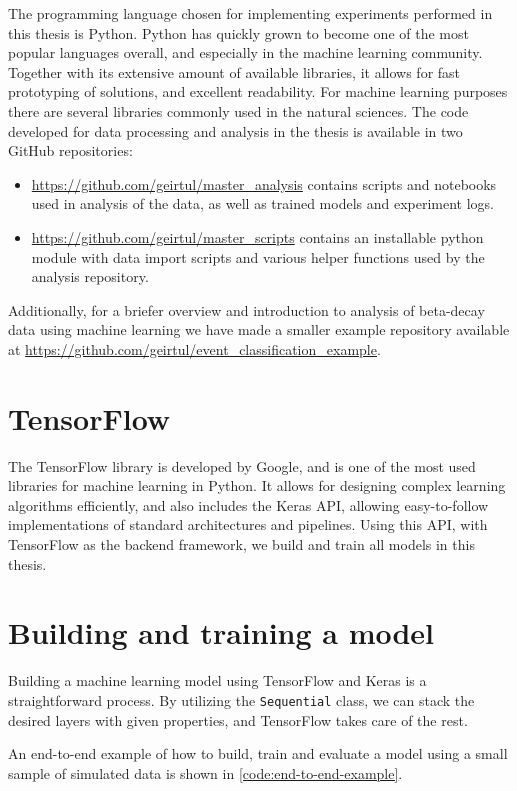 The programming language chosen for implementing experiments performed
in this thesis is Python. Python has quickly grown to become one of the
most popular languages overall, and especially in the machine learning community.
Together with its extensive amount of available libraries, it allows for
fast prototyping of solutions, and excellent readability. For machine learning
purposes there are several libraries commonly used in the natural sciences.
The code developed for data processing and analysis in the thesis is available in two
GitHub repositories:
\begin{itemize}
    \item \url{https://github.com/geirtul/master_analysis}
    contains scripts and notebooks used in analysis of the data, as well as trained
    models and experiment logs.
    \item \url{https://github.com/geirtul/master_scripts}
    contains an installable python module with data import scripts and various helper
    functions used by the analysis repository.
\end{itemize}
Additionally, for a briefer overview and introduction to analysis of beta-decay
data using machine learning we have made a smaller example repository available
at \url{https://github.com/geirtul/event_classification_example}.

\section{TensorFlow}
The TensorFlow\cite{tensorflow2016} library is developed by Google, and is one of the most
used libraries for machine learning in Python. It allows for designing complex learning
algorithms efficiently, and also includes the Keras API\cite{keras2015}, allowing
easy-to-follow implementations of standard architectures and pipelines. Using this API,
with TensorFlow as the backend framework, we build and train all models in this thesis.

\section{Building and training a model}
Building a machine learning model using TensorFlow and Keras is a straightforward
process. By utilizing the \lstinline{Sequential} class, we can stack the desired layers
with given properties, and TensorFlow takes care of the rest.

An end-to-end example of how to build, train and evaluate a model using
a small sample of simulated data is shown in \ref{code:end-to-end-example}.

